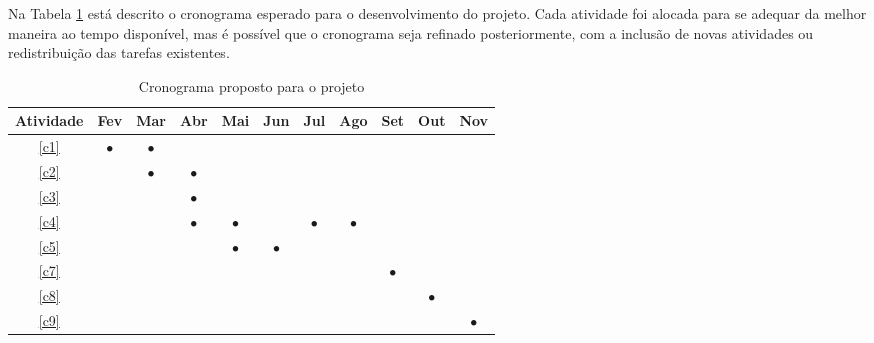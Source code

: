  
Na Tabela \ref{tab:cronograma} está descrito o cronograma esperado para o desenvolvimento do projeto. Cada atividade foi alocada para se adequar da melhor maneira ao tempo disponível, mas é possível que o cronograma seja refinado posteriormente, com a inclusão de novas atividades ou redistribuição das tarefas existentes. 

\begin{table}[h]

\renewcommand{\arraystretch}{1}
\setlength\tabcolsep{3pt}
\begin{center}
\begin{tabular}{| c | c | c | c | c | c | c | c | c | c | c |}
\hline

Atividade &Fev &Mar &Abr &Mai &Jun &Jul &Ago &Set &Out &Nov \\ \hline \hline
\ref{c1}   &$\bullet$ &$\bullet$ & & & & & & & & \\ \hline
\ref{c2}   & &$\bullet$ &$\bullet$ & & & & & & & \\ \hline
\ref{c3}   & & &$\bullet$ & & & & & & & \\ \hline
\ref{c4}   & & &$\bullet$ &$\bullet$ & &$\bullet$ &$\bullet$ & & & \\ \hline
\ref{c5}   & & & &$\bullet$ &$\bullet$ & & & & & \\ \hline
\ref{c7}   & & & & & & & &$\bullet$ & & \\ \hline
\ref{c8}   & & & & & & & & &$\bullet$ & \\ \hline
\ref{c9}   & & & & & & & & & &$\bullet$ \\ 
\hline
\end{tabular}
\end{center}
\caption{Cronograma proposto para o projeto}
\label{tab:cronograma}
\end{table}